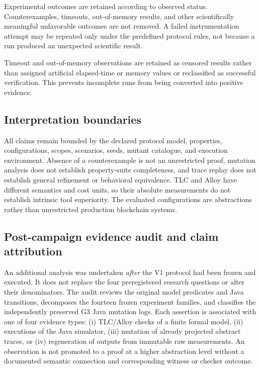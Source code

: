 Experimental outcomes are retained according to observed status.
Counterexamples, timeouts, out-of-memory results, and other scientifically
meaningful unfavorable outcomes are not removed. A failed instrumentation
attempt may be repeated only under the predefined protocol rules, not because a
run produced an unexpected scientific result.

Timeout and out-of-memory observations are retained as censored results rather
than assigned artificial elapsed-time or memory values or reclassified as
successful verification. This prevents incomplete runs from being converted
into positive evidence.

\subsection{Interpretation boundaries}
\label{subsec:method-boundaries}

All claims remain bounded by the declared protocol model, properties,
configurations, scopes, scenarios, seeds, mutant catalogue, and execution
environment. Absence of a counterexample is not an unrestricted proof,
mutation analysis does not establish property-suite completeness, and trace
replay does not establish general refinement or behavioral equivalence. TLC and
Alloy have different semantics and cost units, so their absolute measurements
do not establish intrinsic tool superiority. The evaluated configurations are
abstractions rather than unrestricted production blockchain systems.

\subsection{Post-campaign evidence audit and claim attribution}
\label{subsec:evidence-audit-method}

An additional analysis was undertaken \emph{after} the V1 protocol had been
frozen and executed. It does not replace the four preregistered research
questions or alter their denominators. The audit reviews the original model
predicates and Java transitions, decomposes the fourteen frozen experiment
families, and classifies the independently preserved G3 Java mutation logs.
Each assertion is associated with one of four evidence types: (i) TLC/Alloy
checks of a finite formal model, (ii) executions of the Java simulator,
(iii) mutation of already projected abstract traces, or (iv) regeneration
of outputs from immutable raw measurements. An observation is not promoted
to a proof at a higher abstraction level without a documented semantic
connection and corresponding witness or checker outcome.


